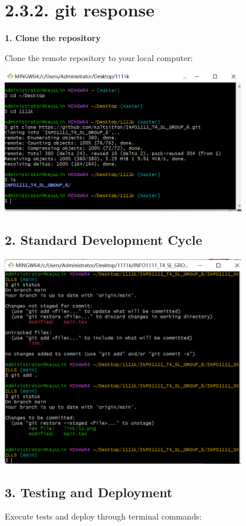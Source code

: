 \documentclass[a4paper, 11pt]{report}
\begin{document}
\section*{2.3.2. git response}
\textbf{1. Clone the repository}

Clone the remote repository to your local computer:

\begin{center}
\includegraphics[width=0.8\textwidth]{link/11.png}
\end{center}

\subsection*{2. Standard Development Cycle}

\begin{center}
\includegraphics[width=0.8\textwidth]{link/22.png}
\end{center}

\subsection*{3. Testing and Deployment}
Execute tests and deploy through terminal commands:
\end{document}
